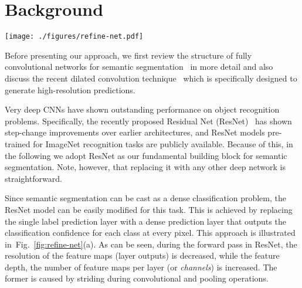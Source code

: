 \documentclass[10pt,twocolumn,letterpaper]{article}
\newcommand{\Fig}{Fig.\xspace}
\newcommand{\Sec}{Sec.\xspace}
\newcommand{\ep}[1]{\emph{(#1)}}
\begin{document}
 






\section{Background}
\label{sec:background}


\begin{figure*}[t]
	\centering	
	\texttt{[image: ./figures/refine-net.pdf]}	
\caption{Comparison of fully convolutional approaches for dense classification. 
Standard multi-layer CNNs, such as ResNet \ep{a} suffer from downscaling of the feature maps, thereby losing fine structures along the way. 
Dilated convolutions \ep{b} remedy this shortcoming by introducing atrous filters, but are computationally expensive to train and quickly reach memory limits even on modern GPUs.
Our proposed architecture that we call RefineNet \ep{c} exploits various levels of detail at different stages of convolutions and fuses them to obtain a high-resolution prediction without the need to maintain large intermediate feature maps. The details of the RefineNet block are outlined in \Sec~\ref{sec:refine-net} and illustrated in Fig~\ref{fig:refine-net-detailed-joint}.}
\label{fig:refine-net}
\end{figure*}

Before presenting our approach, we first review the structure of fully convolutional networks for semantic segmentation~\cite{LongSD14} in more detail and also discuss the recent dilated convolution technique~\cite{ChenPK0Y16} which is specifically designed to generate high-resolution predictions.

Very deep CNNs
have shown outstanding performance on object recognition problems.
Specifically, the recently proposed Residual Net (ResNet)~\cite{He:2016:ResNet} has shown step-change improvements over earlier architectures, and ResNet models pre-trained for ImageNet recognition tasks are publicly available.
Because of this, in the following we adopt ResNet as our fundamental building block for semantic segmentation. Note, however, that replacing it with any other deep network is straightforward.

Since semantic segmentation can be cast as a dense classification problem, the ResNet model can be easily modified for this task.
This is achieved by replacing the single label prediction layer with a dense prediction layer that outputs the classification confidence for each class at every pixel.
This approach is illustrated in~\Fig~\ref{fig:refine-net}(a).
As can be seen, during the forward pass in ResNet, the resolution of the feature maps (layer outputs) is decreased, while the feature depth, \ie the number of feature maps per layer (or {\em channels}) is increased.
The former is caused by striding during convolutional and pooling operations.
\end{document}
